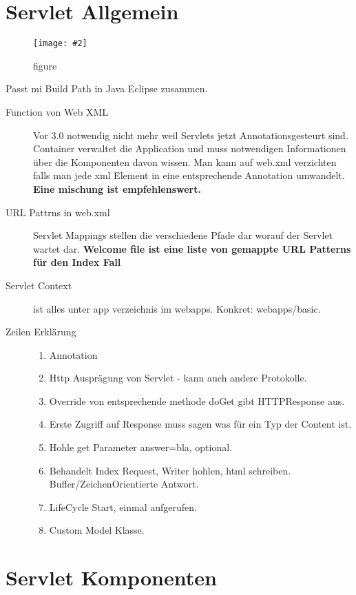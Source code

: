 \documentclass[a4paper,10pt]{scrreprt}
\newcommand{\pic}[2][figure]{\begin{figure}[h]
 \centering
 \texttt{[image: \#2]}
 \caption{#1}
\end{figure}
}
\begin{document}
\section{ Servlet Allgemein}
\pic{dirstruct.png}
Passt mi Build Path in Java Eclipse zusammen.
\begin{description}
 \item [Function von Web XML] Vor 3.0 notwendig nicht mehr weil Servlets jetzt Annotationsgesteurt sind. Container verwaltet die Application und muss notwendigen Informationen über die Komponenten davon wissen.
 Man kann auf web.xml verzichten falls man jede xml Element in eine entsprechende Annotation umwandelt. \textbf{Eine mischung ist empfehlenswert.}
 \item [URL Pattrns in web.xml] Servlet Mappings stellen die verschiedene Pfade dar worauf der Servlet wartet dar. \textbf{Welcome file ist eine liste von gemappte URL Patterns für den Index Fall}
 \item [Servlet Context] ist alles unter app verzeichnis im webapps. Konkret: webapps/basic.
 \item [Zeilen Erklärung] \begin{enumerate}
                           \item Annotation
                           \item Http Ausprägung von Servlet - kann auch andere Protokolle.
                           \item Override von entsprechende methode doGet gibt HTTPResponse aus.
                           \item Erste Zugriff auf Response muss sagen was für ein Typ der Content ist.
                           \item Hohle get Parameter answer=bla, optional.
                           \item Behandelt Index Request, Writer hohlen, html schreiben. Buffer/ZeichenOrientierte Antwort.
                           \item LifeCycle Start, einmal aufgerufen.
                           \item Custom Model Klasse.
                          \end{enumerate}

\end{description}

\section{Servlet Komponenten}
\end{document}
